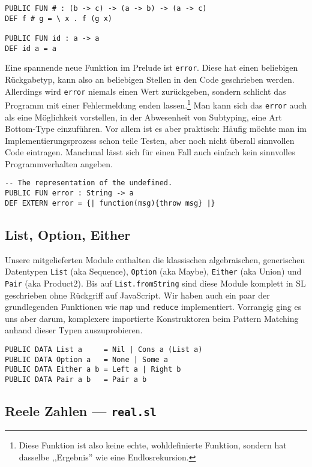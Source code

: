 \documentclass[runningheads]{llncs}
\begin{document}
\begin{verbatim}
PUBLIC FUN # : (b -> c) -> (a -> b) -> (a -> c)
DEF f # g = \ x . f (g x)

PUBLIC FUN id : a -> a
DEF id a = a
\end{verbatim}

Eine spannende neue Funktion im Prelude ist \verb|error|. Diese hat einen
beliebigen Rückgabetyp, kann also an beliebigen Stellen in den Code
geschrieben werden. Allerdings wird \verb|error| niemals einen Wert
zurückgeben, sondern schlicht das Programm mit einer Fehlermeldung enden
lassen.\footnote{Diese Funktion ist also keine echte, wohldefinierte Funktion,
sondern hat dasselbe ,,Ergebnis'' wie eine Endlosrekursion.} Man kann sich
das \verb|error| auch als eine Möglichkeit vorstellen, in der Abwesenheit von
Subtyping, eine Art Bottom-Type einzuführen. Vor allem ist es aber praktisch:
Häufig möchte man im Implementierungsprozess schon teile Testen, aber noch
nicht überall sinnvollen Code eintragen. Manchmal lässt sich für einen
Fall auch einfach kein sinnvolles Programmverhalten angeben.

\begin{verbatim}
-- The representation of the undefined.
PUBLIC FUN error : String -> a
DEF EXTERN error = {| function(msg){throw msg} |} 
\end{verbatim}

\subsection{List, Option, Either}

Unsere mitgelieferten Module enthalten die klassischen algebraischen,
generischen Datentypen \verb|List| (aka Sequence), \verb|Option| (aka Maybe),
\verb|Either| (aka Union) und \verb|Pair| (aka Product2).
Bis auf \verb|List.fromString| sind diese Module komplett in SL geschrieben
ohne Rückgriff auf JavaScript. Wir haben auch ein paar der grundlegenden
Funktionen wie \verb|map| und \verb|reduce| implementiert. Vorrangig ging
es uns aber darum, komplexere importierte Konstruktoren beim Pattern Matching
anhand dieser Typen auszuprobieren.

\begin{verbatim}
PUBLIC DATA List a     = Nil | Cons a (List a)
PUBLIC DATA Option a   = None | Some a
PUBLIC DATA Either a b = Left a | Right b
PUBLIC DATA Pair a b   = Pair a b
\end{verbatim}

\subsection{Reele Zahlen --- \texttt{real.sl}}
\end{document}

